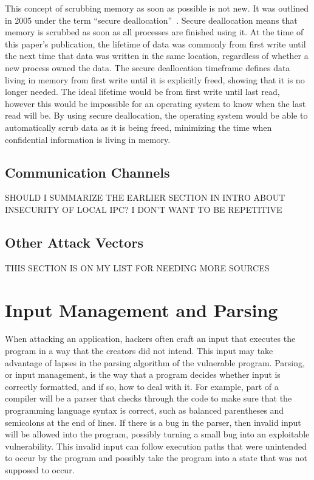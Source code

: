 This concept of scrubbing memory as soon as possible is not new.  It was outlined in 2005 under the term ``secure deallocation''~\cite{chow2005shredding}.  Secure deallocation means that memory is scrubbed as soon as all processes are finished using it.  At the time of this paper's publication, the lifetime of data was commonly from first write until the next time that data was written in the same location, regardless of whether a new process owned the data.  The secure deallocation timeframe defines data living in memory from first write until it is explicitly freed, showing that it is no longer needed.  The ideal lifetime would be from first write until last read, however this would be impossible for an operating system to know when the last read will be.  By using secure deallocation, the operating system would be able to automatically scrub data as it is being freed, minimizing the time when confidential information is living in memory.

\subsection{Communication Channels}
\label{sec:communicationChannels}
SHOULD I SUMMARIZE THE EARLIER SECTION IN INTRO ABOUT INSECURITY OF LOCAL IPC?  I DON'T WANT TO BE REPETITIVE

\subsection{Other Attack Vectors}
\label{sec:otherAttackVectors}
THIS SECTION IS ON MY LIST FOR NEEDING MORE SOURCES

\section{Input Management and Parsing}
\label{sec:inputManagement}
When attacking an application, hackers often craft an input that executes the program in a way that the creators did not intend.  This input may take advantage of lapses in the parsing algorithm of the vulnerable program.  Parsing, or input management, is the way that a program decides whether input is correctly formatted, and if so, how to deal with it.  For example, part of a compiler will be a parser that checks through the code to make sure that the programming language syntax is correct, such as balanced parentheses and semicolons at the end of lines.  If there is a bug in the parser, then invalid input will be allowed into the program, possibly turning a small bug into an exploitable vulnerability.  This invalid input can follow execution paths that were unintended to occur by the program and possibly take the program into a state that was not supposed to occur.

